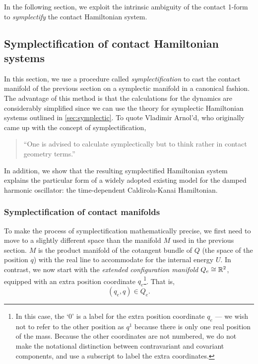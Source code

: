 In the following section, we exploit the intrinsic ambiguity of the contact 1-form to \emph{symplectify} the contact Hamiltonian system.

\subsection{Symplectification of contact Hamiltonian systems}
\label{ssec:symplectification}
In this section, we use a procedure called \emph{symplectification} to cast the contact manifold of the previous section on a symplectic manifold in a canonical fashion. The advantage of this method is that the calculations for the dynamics are considerably simplified since we can use the theory for symplectic Hamiltonian systems outlined in \cref{sec:symplectic}. To quote Vladimir Arnol'd, who originally came up with the concept of symplectification,  \cite{VanderSchaft2021a,Arnold1989a}
\begin{quote}
    ``One is advised to calculate symplectically but to think rather in contact geometry terms.''
\end{quote}
In addition, we show that the resulting symplectified Hamiltonian system explains the particular form of a widely adopted existing model for the damped harmonic oscillator: the time-dependent Caldirola-Kanai Hamiltonian.

\subsubsection{Symplectification of contact manifolds}
To make the process of symplectification mathematically precise, we first need to move to a slightly different space than the manifold \(M\) used in the previous section. \(M\) is the product manifold of the cotangent bundle of \(Q\) (the space of the position \(q\)) with the real line to accommodate for the internal energy \(U\). In contrast, we now start with the \emph{extended configuration manifold} \(Q_e \cong \mathbb{R}^2\), equipped with an extra position coordinate \(q_e\)\footnote{In this case, the `0' is a label for the extra position coordinate $q_e$ --- we wish not to refer to the other position as $q^1$ because there is only one real position of the mass. Because the other coordinates are not numbered, we do not make the notational distinction between contravariant and covariant components, and use a subscript to label the extra coordinates.}. That is,
\begin{equation}
     (q_e, q) \in Q_e.
\end{equation}

